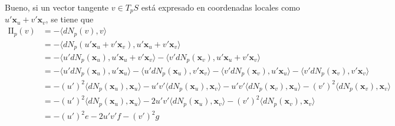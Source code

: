 \documentclass[spanish]{book}
\theoremstyle{definition}
\begin{document}
Bueno, si un vector tangente $v\in T_pS$ está expresado en coordenadas locales como $u'\mathbf{x}_u+v'\mathbf{x}_v$, se tiene que
\begin{align*}
	\mathrm{I\!I}_p(v)&=-\langle dN_p(v),v\rangle\\
	&=-\langle dN_p(u'\mathbf{x}_u+v'\mathbf{x}_v),u'\mathbf{x}_u+v'\mathbf{x}_v\rangle\\
	&=-\langle u'dN_p(\mathbf{x}_u),u'\mathbf{x}_u+v'\mathbf{x}_v\rangle-\langle v'dN_p(\mathbf{x}_v),u'\mathbf{x}_u+v'\mathbf{x}_v\rangle\\
	&=-\langle u'dN_p(\mathbf{x}_u),u'\mathbf{x}_u\rangle-\langle u'dN_p(\mathbf{x}_u),v'\mathbf{x}_v\rangle-\langle v'dN_p(\mathbf{x}_v),u'\mathbf{x}_u\rangle-\langle v'dN_p(\mathbf{x}_v),v'\mathbf{x}_v\rangle\\
	&=-(u')^2\langle dN_p(\mathbf{x}_u),\mathbf{x}_u\rangle-u'v'\langle dN_p(\mathbf{x}_u),\mathbf{x}_v\rangle-u'v'\langle dN_p(\mathbf{x}_v),\mathbf{x}_u\rangle-(v')^2\langle dN_p(\mathbf{x}_v),\mathbf{x}_v\rangle\\
	&=-(u')^2\langle dN_p(\mathbf{x}_u),\mathbf{x}_u\rangle-2u'v'\langle dN_p(\mathbf{x}_u),\mathbf{x}_v\rangle-(v')^2\langle dN_p(\mathbf{x}_v),\mathbf{x}_v\rangle\\
	&=-(u')^2e-2u'v'f-(v')^2g\\
\end{align*}
\end{document}
